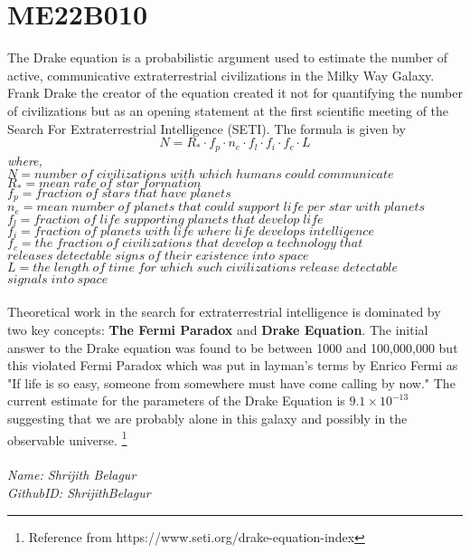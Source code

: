 \section{ME22B010}
The Drake equation is a probabilistic argument used to estimate the number of active, communicative extraterrestrial civilizations in the Milky Way Galaxy. Frank Drake the creator of the equation created it not for quantifying the number of civilizations but as an opening statement at the first scientific meeting of the Search For Extraterrestrial Intelligence (SETI). The formula is given by 
$$N=R_* \cdot f_p \cdot n_e \cdot f_l \cdot f_i \cdot f_c \cdot L$$
\textit{where,}\\
\textit{$N=number\;of\;civilizations\;with\;which\;humans\;could\;communicate$}\\
\textit{$R_*=mean\;rate\;of\;star\;formation$}\\
\textit{$f_p=fraction\;of\;stars\;that\;have\;planets$}\\
\textit{$n_e=mean\;number\;of\;planets\;that\;could\;support\;life\;per\;star\;with\;planets$}\\
\textit{$f_l=fraction\;of\;life\;supporting\;planets\;that\;develop\;life$}\\
\textit{$f_i=fraction\;of\;planets\;with\;life\;where\;life\;develops\;intelligence$}\\
\textit{$f_c=the\;fraction\;of\;civilizations\;that\;develop\;a\;technology\;that$}\\
\textit{$releases\;detectable\;signs\;of\;their\;existence\;into\;space$}\\
\textit{$L=the\;length\;of\;time\;for\;which\;such\;civilizations\;release\;detectable$}\\
\textit{$signals\;into\;space$}
\\
\\
Theoretical work in the search for extraterrestrial intelligence is dominated by two key concepts: \textbf{The Fermi Paradox} and \textbf{Drake Equation}. The initial answer to the Drake equation was found to be between 1000 and 100,000,000 but this violated Fermi Paradox which was put in layman's terms by Enrico Fermi as "If life is so easy, someone from somewhere must have come calling by now." The current estimate for the parameters of the Drake Equation is $9.1 \times 10^{-13}$ suggesting that we are probably alone in this galaxy and possibly in the observable universe.
\footnote{Reference from https://www.seti.org/drake-equation-index}\\
\\
\emph{Name: Shrijith Belagur} \\
\emph{GithubID: ShrijithBelagur} \\
